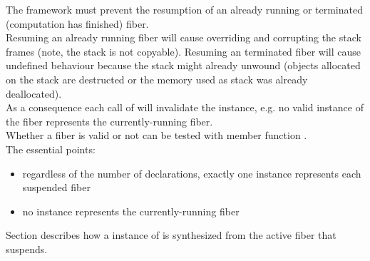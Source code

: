 \label{invalidation}

The framework must prevent the resumption of an already running or terminated
(computation has finished) fiber.\\
Resuming an already running fiber will cause overriding and corrupting the stack
frames (note, the stack is not copyable).  Resuming an terminated fiber will
cause undefined behaviour because the stack might already unwound (objects
allocated on the stack are destructed or the memory used as stack was already
deallocated).\\
As a consequence each call of \resume will invalidate the \fiber instance, e.g.
no valid instance of the fiber represents the currently-running fiber.\\
Whether a fiber is valid or not can be tested with member function \opbool.\\

The essential points:
\begin{itemize}
    \item regardless of the number of \fiber declarations, exactly one \fiber
          instance represents each suspended fiber
    \item no \fiber instance represents the currently-running fiber
\end{itemize}

Section  describes how a instance of \fiber is
synthesized from the active fiber that suspends.\\

